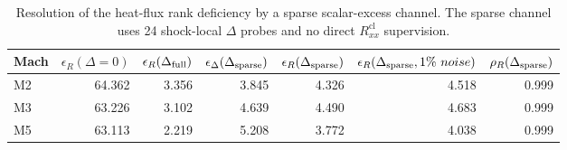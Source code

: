 \begin{table}
\caption{Resolution of the heat-flux rank deficiency by a sparse scalar-excess channel. The sparse channel uses 24 shock-local \(\Delta\) probes and no direct \(R^{\mathrm{cl}}_{xx}\) supervision.}
\label{tab:delta_rbf_robustness}
\begin{tabular}{lrrrrrr}
\toprule
Mach & $\epsilon_R(\Delta=0)$ & $\epsilon_R(\Delta_{\rm full})$ & $\epsilon_\Delta(\Delta_{\rm sparse})$ & $\epsilon_R(\Delta_{\rm sparse})$ & $\epsilon_R(\Delta_{\rm sparse},1\%\ noise)$ & $\rho_R(\Delta_{\rm sparse})$ \\
\midrule
M2 & 64.362 & 3.356 & 3.845 & 4.326 & 4.518 & 0.999 \\
M3 & 63.226 & 3.102 & 4.639 & 4.490 & 4.683 & 0.999 \\
M5 & 63.113 & 2.219 & 5.208 & 3.772 & 4.038 & 0.999 \\
\bottomrule
\end{tabular}
\end{table}
